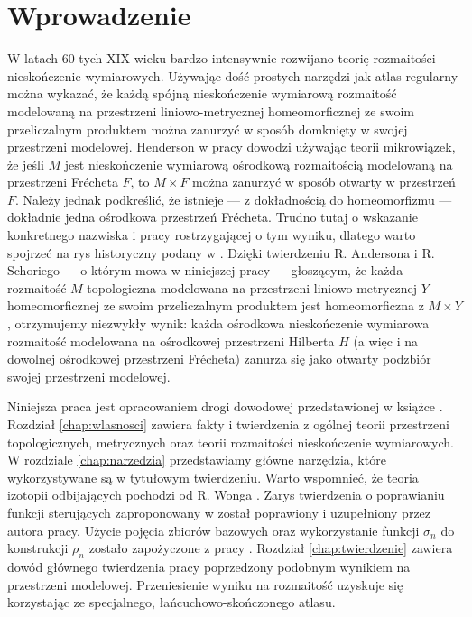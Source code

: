 \section{Wprowadzenie}
W latach 60-tych XIX wieku bardzo intensywnie rozwijano teorię rozmaitości nieskończenie wymiarowych. Używając dość prostych narzędzi jak atlas regularny można wykazać, że każdą spójną nieskończenie wymiarową rozmaitość modelowaną na przestrzeni liniowo-metrycznej homeomorficznej ze swoim przeliczalnym produktem można zanurzyć w sposób domknięty w swojej przestrzeni modelowej. Henderson w pracy \cite{hen} dowodzi używając teorii mikrowiązek, że jeśli $M$ jest nieskończenie wymiarową ośrodkową rozmaitością modelowaną na przestrzeni Frécheta $F$, to $M\times F$ można zanurzyć w sposób otwarty w przestrzeń $F$. Należy jednak podkreślić, że istnieje --- z dokładnością do homeomorfizmu --- dokładnie jedna ośrodkowa przestrzeń Frécheta. Trudno tutaj o wskazanie konkretnego nazwiska i pracy rostrzygającej o tym wyniku, dlatego warto spojrzeć na rys historyczny podany w \cite{bp}. Dzięki twierdzeniu R. Andersona i R. Schoriego --- o którym mowa w niniejszej pracy --- głoszącym, że każda rozmaitość $M$ topologiczna modelowana na przestrzeni liniowo-metrycznej $Y$ homeomorficznej ze swoim przeliczalnym produktem jest homeomorficzna z $M\times Y$, otrzymujemy niezwykły wynik: każda ośrodkowa nieskończenie wymiarowa rozmaitość modelowana na ośrodkowej przestrzeni Hilberta $H$ (a więc i na dowolnej ośrodkowej przestrzeni Frécheta) zanurza się jako otwarty podzbiór swojej przestrzeni modelowej.

Niniejsza praca jest opracowaniem drogi dowodowej przedstawionej w książce \cite{bp}. Rozdział \ref{chap:wlasnosci} zawiera fakty i twierdzenia z ogólnej teorii przestrzeni topologicznych, metrycznych oraz teorii rozmaitości nieskończenie wymiarowych. W rozdziale \ref{chap:narzedzia} przedstawiamy główne narzędzia, które wykorzystywane są w tytułowym twierdzeniu. Warto wspomnieć, że teoria izotopii odbijających pochodzi od R. Wonga \cite{won}. Zarys twierdzenia o poprawianiu funkcji sterujących zaproponowany w \cite{bp} został poprawiony i uzupełniony przez autora pracy. Użycie pojęcia zbiorów bazowych oraz wykorzystanie funkcji $\sigma_n$ do konstrukcji $\rho_n$ zostało zapożyczone z pracy \cite{sch}. Rozdział \ref{chap:twierdzenie} zawiera dowód głównego twierdzenia pracy poprzedzony podobnym wynikiem na przestrzeni modelowej. Przeniesienie wyniku na rozmaitość uzyskuje się korzystając ze specjalnego, łańcuchowo-skończonego atlasu.